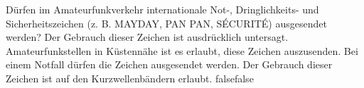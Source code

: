     {Dürfen im Amateurfunkverkehr internationale Not-, Dringlichkeits- und Sicherheitszeichen (z. B. MAYDAY, PAN PAN, SÉCURITÉ) ausgesendet werden?}
    {Der Gebrauch dieser Zeichen ist ausdrücklich untersagt.}
    {Amateurfunkstellen in Küstennähe ist es erlaubt, diese Zeichen auszusenden.}
    {Bei einem Notfall dürfen die Zeichen ausgesendet werden.}
    {Der Gebrauch dieser Zeichen ist auf den Kurzwellenbändern erlaubt.}
    {false}{false}